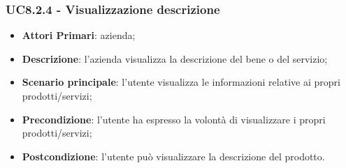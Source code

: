 \subsubsection{UC8.2.4 - Visualizzazione descrizione}
\begin{itemize}
	\item \textbf{Attori Primari}: azienda;
	\item \textbf{Descrizione}: l'azienda visualizza la descrizione del bene o del servizio;
	\item \textbf{Scenario principale}: l'utente visualizza le informazioni relative ai propri prodotti/servizi;
	\item \textbf{Precondizione}: l'utente ha espresso la volontà di visualizzare i propri prodotti/servizi;
	\item \textbf{Postcondizione}: l'utente può visualizzare la descrizione del prodotto.
\end{itemize}

